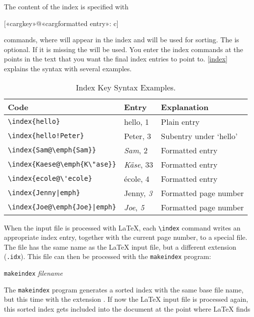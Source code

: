 The content of the index is specified with
\begin{lscommand}
  [{{«\bs carg{key}»@«\bs carg{formatted entry}»}}: c]
\end{lscommand}
\noindent commands, where  will appear in the index
and  will be used for sorting.  The  is
optional. If it is missing the  will be used. You enter the index
commands at the points in the text that you want the final index entries to
point to. \autoref{index} explains the syntax with several examples.

\begin{table}[!tp]
  \centering
  \caption{Index Key Syntax Examples.}\label{index}
  \begin{tabular}{@{}lll@{}}
    \toprule
    Code                                   & Entry                 & Explanation            \\
    \midrule
    \rule{0pt}{1.05em}\verb|\index{hello}| & hello, 1              & Plain entry            \\
    \verb|\index{hello!Peter}|             & \hspace*{2ex}Peter, 3 & Subentry under `hello' \\
    \verb|\index{Sam@\emph{Sam}}|          & \emph{Sam}, 2         & Formatted entry        \\
    \verb|\index{Kaese@\emph{K\"ase}}|     & \emph{K\"ase}, 33     & Formatted entry        \\
    \verb.\index{ecole@\'ecole}.           & \'ecole, 4            & Formatted entry        \\
    \verb.\index{Jenny|emph}.              & Jenny, \emph{3}       & Formatted page number  \\
    \verb.\index{Joe@\emph{Joe}|emph}.     & \emph{Joe}, \emph{5}  & Formatted page number  \\
    \bottomrule
  \end{tabular}
\end{table}

When the input file is processed with \LaTeX{}, each \verb|\index|
command writes an appropriate index entry, together with the current
page number, to a special file. The file has the same name as the
\LaTeX{} input file, but a different extension (\verb|.idx|). This
 file can then be processed with the \texttt{makeindex}
program:

\begin{lscommand}
  \texttt{makeindex} \emph{filename}
\end{lscommand}
The \texttt{makeindex} program generates a sorted index with the same base
file name, but this time with the extension . If now the
\LaTeX{} input file is processed again, this sorted index gets
included into the document at the point where \LaTeX{} finds
\begin{lscommand}
\end{lscommand}

